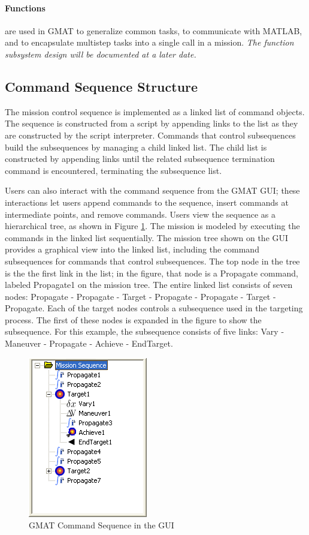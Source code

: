 \paragraph{Functions} are used in GMAT to generalize common tasks, to communicate with MATLAB, and
to encapsulate multistep tasks into a single call in a mission.  \textit{The function subsystem
design will be documented at a later date.}

\subsection{Command Sequence Structure}

The mission control sequence is implemented as a linked list of command objects.  The sequence is
constructed from a script by appending links to the list as they are constructed by the script
interpreter.  Commands that control subsequences build the subsequences by managing a child linked
list.  The child list is constructed by appending links until the related subsequence termination
command is encountered, terminating the subsequence list.

Users can also interact with the command sequence from the GMAT GUI; these interactions let users
append commands to the sequence, insert commands at intermediate points, and remove commands.  Users
view the sequence as a hierarchical tree, as shown in Figure \ref{figure:HierarchicalMissionTree}.
The mission is modeled by executing the commands in the linked list sequentially.  The mission tree
shown on the GUI provides a graphical view into the linked list, including the command subsequences
for commands that control subsequences.  The top node in the tree is the the first link in the list;
in the figure, that node is a Propagate command, labeled Propagate1 on the mission tree.  The entire
linked list consists of seven nodes: Propagate - Propagate - Target - Propagate - Propagate - Target
- Propagate.  Each of the target nodes controls a subsequence used in the targeting process.  The
first of these nodes is expanded in the figure to show the subsequence.  For this example, the
subsequence consists of five links: Vary - Maneuver - Propagate - Achieve - EndTarget.

\begin{figure}[htb]
\begin{center}
\includegraphics[99,133]{Images/HierarchicalMissionTree.png}
\caption{\label{figure:HierarchicalMissionTree}GMAT Command Sequence in the GUI}
\end{center}
\end{figure}

